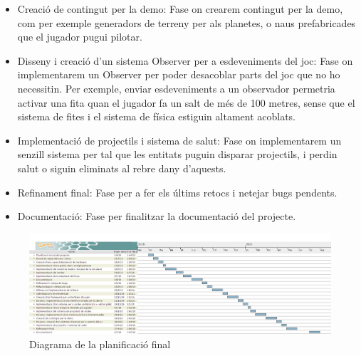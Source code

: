 \begin{itemize}
  \item{Creació de contingut per la demo: }Fase on crearem contingut per la demo, com per exemple generadors de terreny per als planetes, o naus prefabricades que el jugador pugui pilotar.
  \item{Disseny i creació d'un sistema Observer per a esdeveniments del joc: }Fase on implementarem un Observer per poder desacoblar parts del joc que no ho necessitin. Per exemple, enviar esdeveniments a un observador permetria activar una fita quan el jugador fa un salt de més de 100 metres, sense que el sistema de fites i el sistema de física estiguin altament acoblats.
  \item{Implementació de projectils i sistema de salut: }Fase on implementarem un senzill sistema per tal que les entitats puguin disparar projectils, i perdin salut o siguin eliminats al rebre dany d'aquests.
  \item{Refinament final: }Fase per a fer els últims retocs i netejar bugs pendents.
  \item{Documentació: }Fase per finalitzar la documentació del projecte.
\end{itemize}
\begin{figure}[H]
  \centering
  \includegraphics[angle=90,origin=c,scale=0.4]{img/novaPlanificacio}
  \caption{Diagrama de la planificació final}
\end{figure}

